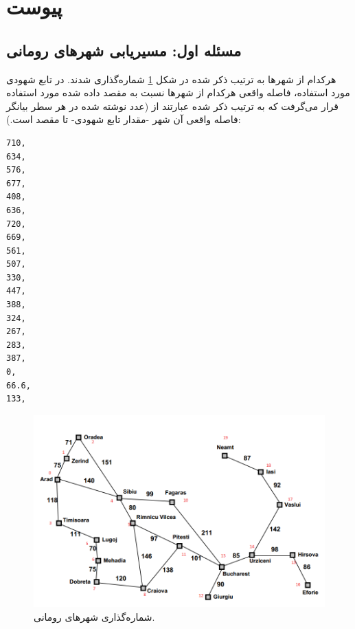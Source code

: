 \appendix
\section{پیوست}
\subsection{مسئله اول: مسیریابی شهرهای رومانی} \label{p1-app}
هرکدام از شهرها به ترتیب ذکر شده در شکل
\ref{p1-edited}
شماره‌گذاری شدند. در تابع شهودی مورد استفاده، فاصله واقعی هرکدام از شهرها نسبت به مقصد داده شده مورد استفاده قرار می‌گرفت که به ترتیب ذکر شده عبارتند از (عدد نوشته شده در هر سطر بیانگر فاصله واقعی آن شهر -مقدار تابع شهودی- تا مقصد است.):
\begin{latin}
	\begin{lstlisting}
710,
634,
576,
677,
408,
636,
720,
669,
561,
507,
330,
447,
388,
324,
267,
283,
387,
0,
66.6,
133,
\end{lstlisting}
\end{latin}

\begin{figure}[H]
	\centering
	\includegraphics[width=14cm]{./Resources/p1e.png}
	\caption{شماره‌گذاری شهرهای رومانی.}
	\label{p1-edited}
\end{figure}